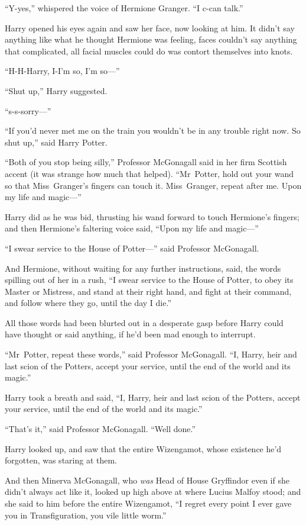 “Y-yes,” whispered the voice of Hermione Granger. “I c-can talk.”

Harry opened his eyes again and saw her face, now looking at him. It didn’t say anything like what he thought Hermione was feeling, faces couldn’t say anything that complicated, all facial muscles could do was contort themselves into knots.

“H-H-Harry, I-I’m so, I’m so—”

“Shut up,” Harry suggested.

“s-s-sorry—”

“If you’d never met me on the train you wouldn’t be in any trouble right now. So shut up,” said Harry Potter.

“Both of you stop being silly,” Professor McGonagall said in her firm Scottish accent (it was strange how much that helped). “Mr~Potter, hold out your wand so that Miss~Granger’s fingers can touch it. Miss~Granger, repeat after me. Upon my life and magic—”

Harry did as he was bid, thrusting his wand forward to touch Hermione’s fingers; and then Hermione’s faltering voice said, “Upon my life and magic—”

“I swear service to the House of Potter—” said Professor McGonagall.

And Hermione, without waiting for any further instructions, said, the words spilling out of her in a rush, “I swear service to the House of Potter, to obey its Master or Mistress, and stand at their right hand, and fight at their command, and follow where they go, until the day I die.”

All those words had been blurted out in a desperate gasp before Harry could have thought or said anything, if he’d been mad enough to interrupt.

“Mr~Potter, repeat these words,” said Professor McGonagall. “I, Harry, heir and last scion of the Potters, accept your service, until the end of the world and its magic.”

Harry took a breath and said, “I, Harry, heir and last scion of the Potters, accept your service, until the end of the world and its magic.”

“That’s it,” said Professor McGonagall. “Well done.”

Harry looked up, and saw that the entire Wizengamot, whose existence he’d forgotten, was staring at them.

And then Minerva McGonagall, who \emph{was} Head of House Gryffindor even if she didn’t always act like it, looked up high above at where Lucius Malfoy stood; and she said to him before the entire Wizengamot, “I regret every point I ever gave you in Transfiguration, you vile little worm.”

